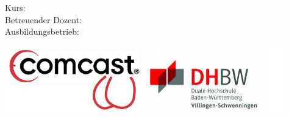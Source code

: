 \begin{titlepage}

\maketitle
\thispagestyle{empty}

\begin{centering}
Kurs: \Kurs\\
Betreuender Dozent: \guardian\\
Ausbildungsbetrieb: \company\\
\end{centering}

{
	\vspace{13cm}
}



\includegraphics[width=6cm]{bilder/company_logo.png}
\hfill
\includegraphics[width=6cm]{bilder/institute_logo.png}

\vfill

\end{titlepage}